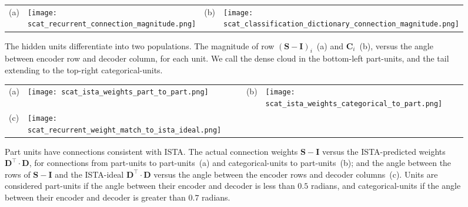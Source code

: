 \documentclass{article} %
\newcommand{\C}{\mathbf{C}}
\newcommand{\D}{\mathbf{D}}
\newcommand{\I}{\mathbf{I}}
\newcommand{\Sm}{\mathbf{S}}
\begin{document}
\appendix

\begin{figure}[p] %
  \begin{center}
    \begin{tabular}{p{0.04in}p{2.4in}p{0.04in}p{2.4in}}
      \parbox[b]{0in}{(a) \vspace{3.8cm}} & \texttt{[image: scat\_recurrent\_connection\_magnitude.png]} &
      \parbox[b]{0in}{(b) \vspace{3.8cm}} & \texttt{[image: scat\_classification\_dictionary\_connection\_magnitude.png]} 
    \end{tabular}
  \end{center}
  \caption{The hidden units differentiate into two populations.  The magnitude of row $\left( \Sm - \I \right)_i$~(a) and $\C_i$~(b), versus the angle between encoder row and decoder column, for each unit.  We call the dense cloud in the bottom-left part-units, and the tail extending to the top-right categorical-units. \label{two_classes_figure}}
\end{figure}


\begin{figure}[p] %
  \begin{center}
    \begin{tabular}{p{0.04in}p{2.4in}p{0.04in}p{2.4in}}
      \parbox[b]{0in}{(a) \vspace{3.8cm}} & \texttt{[image: scat\_ista\_weights\_part\_to\_part.png]} &
      \parbox[b]{0in}{(b) \vspace{3.8cm}} & \texttt{[image: scat\_ista\_weights\_categorical\_to\_part.png]}  \\
      \parbox[b]{0in}{(c) \vspace{3.8cm}} & \texttt{[image: scat\_recurrent\_weight\_match\_to\_ista\_ideal.png]}
    \end{tabular}
  \end{center}
  \caption{Part units have connections consistent with ISTA.  The actual connection weights $\Sm - \I$ versus the ISTA-predicted weights $\D^{\top} \cdot \D$, for connections from part-units to part-units~(a) and categorical-units to part-units~(b); and the angle between the rows of $\Sm - \I$ and the ISTA-ideal $\D^{\top} \cdot \D$ versus the angle between the encoder rows and decoder columns~(c).  Units are considered part-units if the angle between their encoder and decoder is less than $0.5$ radians, and categorical-units if the angle between their encoder and decoder is greater than $0.7$ radians. \label{ista_ideal_connections_figure}}
\end{figure}
\end{document}
